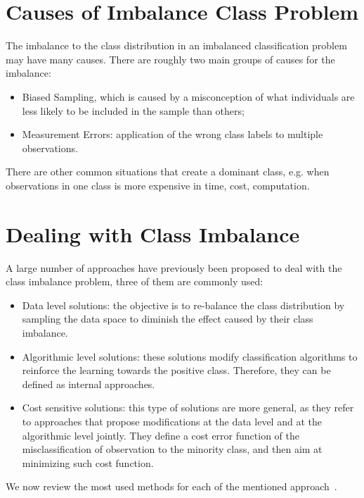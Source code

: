 \section{Causes of Imbalance Class Problem}
The imbalance to the class distribution in an imbalanced classification  problem may have many causes.
There are roughly two main groups of causes for the imbalance:
 \begin{itemize}
     \item{Biased Sampling, which is caused by a misconception of what individuals are less likely to be included in the sample than others;}
     \item{Measurement Errors: application of the wrong class labels to multiple observations.}
 \end{itemize}
\noindent
There are other common situations that create a dominant class, e.g. when observations in one class is more expensive in time, cost, computation.

\section{Dealing with  Class Imbalance}
A large number of approaches have previously been proposed to deal with the class imbalance problem, three of them  are commonly used:
\begin{itemize}
    \item{Data level solutions: the objective is to re-balance the class distribution by sampling the data space to diminish the effect caused by their class imbalance.}
    \item{Algorithmic level solutions: these solutions  modify classification algorithms to reinforce the learning towards the positive class. Therefore, they can be defined as internal approaches.}
    \item{Cost sensitive solutions: this type of solutions are more general, as they refer to approaches that propose modifications at the data level and at the algorithmic level jointly. They define a cost error function of the misclassification of observation to the minority class, and then aim at minimizing such cost function.}
\end{itemize}
\noindent
We now review the most used methods for each of the mentioned approach~\cite{more2016survey}.


